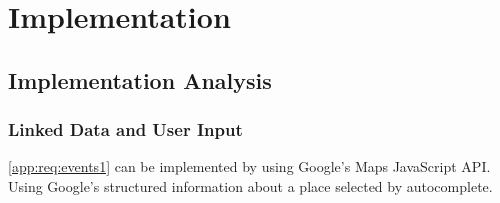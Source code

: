 \chapter{Implementation}

\section{Implementation Analysis}

\subsection{Linked Data and User Input}

\ref{app:req:events1} can be implemented by using Google's Maps JavaScript API. Using Google's structured information about a place selected by autocomplete.

